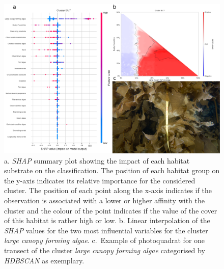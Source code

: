 \begin{figure}
\hypertarget{fig:chap2figS27}{%
\centering
\includegraphics{03-Chapitre2/figures/supplementary/05-explanation_shap_pq_cluster_7.png}
\caption{a. \emph{SHAP} summary plot showing the impact of each habitat
substrate on the classification. The position of each habitat group on
the y-axis indicates its relative importance for the considered cluster.
The position of each point along the x-axis indicates if the observation
is associated with a lower or higher affinity with the cluster and the
colour of the point indicates if the value of the cover of this habitat
is rather high or low. b. Linear interpolation of the \emph{SHAP} values
for the two most influential variables for the cluster \emph{large
canopy forming algae}. c.~Example of photoquadrat for one transect of
the cluster \emph{large canopy forming algae} categorised by
\emph{HDBSCAN} as exemplary.}\label{fig:chap2figS27}
}
\end{figure}

